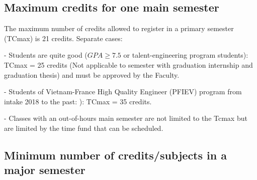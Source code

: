 \subsection{Maximum credits for one main semester}
The maximum number of credits allowed to register in a primary semester (TCmax) is 21 credits. Separate cases:

- Students are quite good ($ GPA \ge 7.5 $ or talent-engineering program students): TCmax = 25 credits (Not applicable to semester with graduation internship and graduation thesis) and must be approved by the Faculty.

- Students of Vietnam-France High Quality Engineer (PFIEV) program from intake 2018 to the past: ): TCmax = 35 credits.

- Classes with an out-of-hours main semester are not limited to the Tcmax but are limited by the time fund that can be scheduled.

\subsection{Minimum number of credits/subjects in a major semester}

